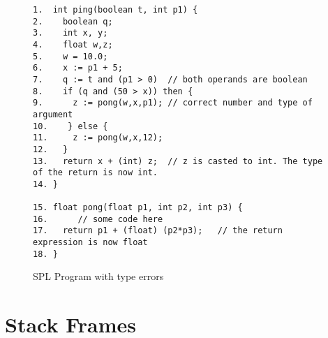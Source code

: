 \documentclass{article}
\begin{document}
\begin{figure}
\begin{verbatim}
1.  int ping(boolean t, int p1) {
2.    boolean q;
3.    int x, y;
4.    float w,z;
5.    w = 10.0;
6.    x := p1 + 5;
7.    q := t and (p1 > 0)  // both operands are boolean
8.    if (q and (50 > x)) then {
9.      z := pong(w,x,p1); // correct number and type of argument
10.    } else {
11.     z := pong(w,x,12); 
12.   }
13.   return x + (int) z;  // z is casted to int. The type of the return is now int.
14. }
 
15. float pong(float p1, int p2, int p3) {
16.      // some code here
17.   return p1 + (float) (p2*p3);   // the return expression is now float
18. }
\end{verbatim}
\caption{SPL Program with type errors}\label{fig:typecorrect}
\end{figure}


\section{Stack Frames}
\end{document}
